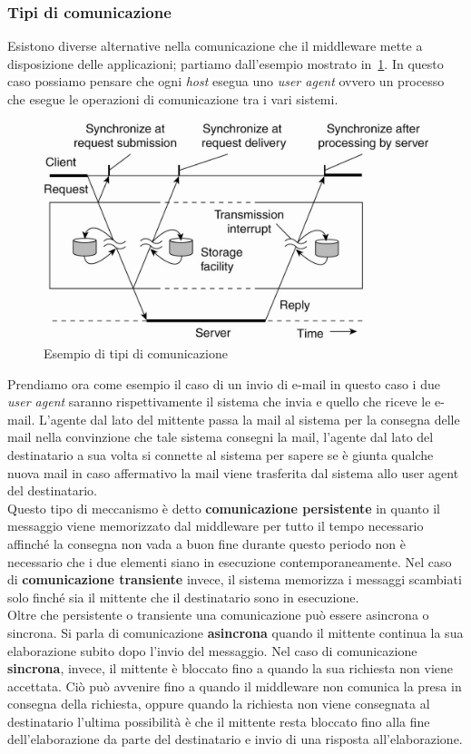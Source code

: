 \subsubsection{Tipi di comunicazione}
Esistono diverse alternative nella comunicazione che il middleware mette a disposizione delle applicazioni; partiamo dall'esempio mostrato in \figurename\,\ref{img:midcomuni}. In questo caso possiamo pensare che ogni \emph{host} esegua uno \emph{user agent} ovvero un processo che esegue le operazioni di comunicazione tra i vari sistemi.\\
\begin{figure}
\centering
\includegraphics[scale=0.5]{img/midcomuni.png}
\caption{Esempio di tipi di comunicazione}\label{img:midcomuni}
\end{figure}
Prendiamo ora come esempio il caso di un invio di e-mail in questo caso i due \emph{user agent} saranno rispettivamente il sistema che invia e quello che riceve le e-mail. L'agente dal lato del mittente passa la mail al sistema per la consegna delle mail nella convinzione che tale sistema consegni la mail, l'agente dal lato del destinatario a sua volta si connette al sistema per sapere se è giunta qualche nuova mail in caso affermativo la mail viene trasferita dal sistema allo user agent del destinatario.\\
Questo tipo di meccanismo è detto \textbf{comunicazione persistente} in quanto il messaggio viene memorizzato dal middleware per tutto il tempo necessario affinché la consegna non vada a buon fine durante questo periodo non è necessario che i due elementi siano in esecuzione contemporaneamente. Nel caso di \textbf{comunicazione transiente} invece, il sistema memorizza i messaggi scambiati solo finché sia il mittente che il destinatario sono in esecuzione.\\
Oltre che persistente o transiente una comunicazione può essere asincrona o sincrona. Si parla di comunicazione \textbf{asincrona} quando il mittente continua la sua elaborazione subito dopo l'invio del messaggio. Nel caso di comunicazione \textbf{sincrona}, invece, il mittente è bloccato fino a quando la sua richiesta non viene accettata. Ciò può avvenire fino a quando il middleware non comunica la presa in consegna della richiesta, oppure quando la richiesta non viene consegnata al destinatario l'ultima possibilità è che il mittente resta bloccato fino alla fine dell'elaborazione da parte del destinatario e invio di una risposta all'elaborazione.\\
